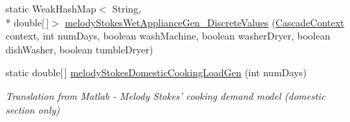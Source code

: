 \begin{DoxyCompactItemize}
static Weak\-Hash\-Map$<$ String, \\*
double\mbox{[}$\,$\mbox{]}$>$ \hyperlink{classuk_1_1ac_1_1dmu_1_1iesd_1_1cascade_1_1util_1_1_initial_profile_gen_utils_a51bad98a5e63e61ccb47ed7dbbd18582}{melody\-Stokes\-Wet\-Appliance\-Gen\-\_\-\-Discrete\-Values} (\hyperlink{classuk_1_1ac_1_1dmu_1_1iesd_1_1cascade_1_1context_1_1_cascade_context}{Cascade\-Context} context, int num\-Days, boolean wash\-Machine, boolean washer\-Dryer, boolean dish\-Washer, boolean tumble\-Dryer)
\item 
static double\mbox{[}$\,$\mbox{]} \hyperlink{classuk_1_1ac_1_1dmu_1_1iesd_1_1cascade_1_1util_1_1_initial_profile_gen_utils_a49f16d85088f8c945254ef5749cb6150}{melody\-Stokes\-Domestic\-Cooking\-Load\-Gen} (int num\-Days)
\begin{DoxyCompactList}\small\item\em Translation from Matlab -\/ Melody Stokes' cooking demand model (domestic section only) \end{DoxyCompactList}\end{DoxyCompactItemize}

